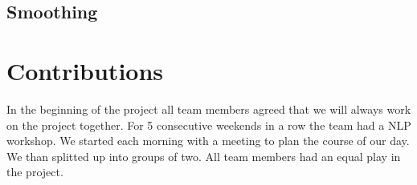 \documentclass[a4paper,12pt]{article}
\begin{document}
\subsection{Smoothing}






\section{Contributions}
\label{sec:contributions}
In the beginning of the project all team members agreed that we will always work on the project together. For 5 consecutive weekends in a row the team had a NLP workshop. We started each morning with a meeting to plan  the course of our day. We than splitted up into groups of two. All team members had an equal play in the project. 

\clearpage


\end{document}
